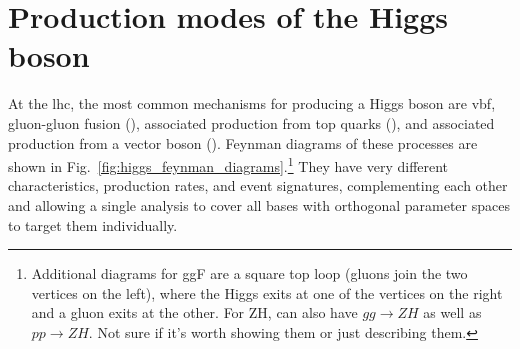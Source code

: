 



\section{Production modes of the Higgs boson}
\label{sec:htoinv_production_modes}

At the \acrshort{lhc}, the most common mechanisms for producing a Higgs boson are \acrfull{vbf}, gluon-gluon fusion (\ggF), associated production from top quarks (\ttH), and associated production from a vector boson (\VH). Feynman diagrams of these processes are shown in Fig.~\ref{fig:higgs_feynman_diagrams}.\footnote{Additional diagrams for ggF are a square top loop (gluons join the two vertices on the left), where the Higgs exits at one of the vertices on the right and a gluon exits at the other. For ZH, can also have $gg\to ZH$ as well as $pp\to ZH$. Not sure if it's worth showing them or just describing them.} They have very different characteristics, production rates, and event signatures, complementing each other and allowing a single analysis to cover all bases with orthogonal parameter spaces to target them individually.

